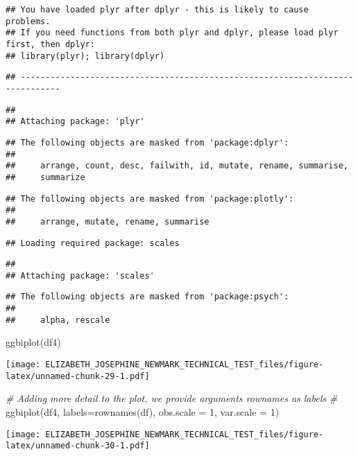 \documentclass[
]{article}
\newenvironment{Shaded}{\begin{snugshade}}{\end{snugshade}}
\newcommand{\AttributeTok}[1]{\textcolor[rgb]{0.77,0.63,0.00}{#1}}
\newcommand{\CommentTok}[1]{\textcolor[rgb]{0.56,0.35,0.01}{\textit{#1}}}
\newcommand{\DecValTok}[1]{\textcolor[rgb]{0.00,0.00,0.81}{#1}}
\newcommand{\FunctionTok}[1]{\textcolor[rgb]{0.00,0.00,0.00}{#1}}
\newcommand{\NormalTok}[1]{#1}
\begin{document}
\begin{verbatim}
## You have loaded plyr after dplyr - this is likely to cause problems.
## If you need functions from both plyr and dplyr, please load plyr first, then dplyr:
## library(plyr); library(dplyr)
\end{verbatim}

\begin{verbatim}
## ------------------------------------------------------------------------------
\end{verbatim}

\begin{verbatim}
## 
## Attaching package: 'plyr'
\end{verbatim}

\begin{verbatim}
## The following objects are masked from 'package:dplyr':
## 
##     arrange, count, desc, failwith, id, mutate, rename, summarise,
##     summarize
\end{verbatim}

\begin{verbatim}
## The following objects are masked from 'package:plotly':
## 
##     arrange, mutate, rename, summarise
\end{verbatim}

\begin{verbatim}
## Loading required package: scales
\end{verbatim}

\begin{verbatim}
## 
## Attaching package: 'scales'
\end{verbatim}

\begin{verbatim}
## The following objects are masked from 'package:psych':
## 
##     alpha, rescale
\end{verbatim}

\begin{Shaded}
\begin{Highlighting}[]
\FunctionTok{ggbiplot}\NormalTok{(df4)}
\end{Highlighting}
\end{Shaded}

\texttt{[image: ELIZABETH\_JOSEPHINE\_NEWMARK\_TECHNICAL\_TEST\_files/figure-latex/unnamed-chunk-29-1.pdf]}

\begin{Shaded}
\begin{Highlighting}[]
\CommentTok{\# Adding more detail to the plot, we provide arguments rownames as labels}
\CommentTok{\# }
\FunctionTok{ggbiplot}\NormalTok{(df4, }\AttributeTok{labels=}\FunctionTok{rownames}\NormalTok{(df), }\AttributeTok{obs.scale =} \DecValTok{1}\NormalTok{, }\AttributeTok{var.scale =} \DecValTok{1}\NormalTok{)}
\end{Highlighting}
\end{Shaded}

\texttt{[image: ELIZABETH\_JOSEPHINE\_NEWMARK\_TECHNICAL\_TEST\_files/figure-latex/unnamed-chunk-30-1.pdf]}
\end{document}
